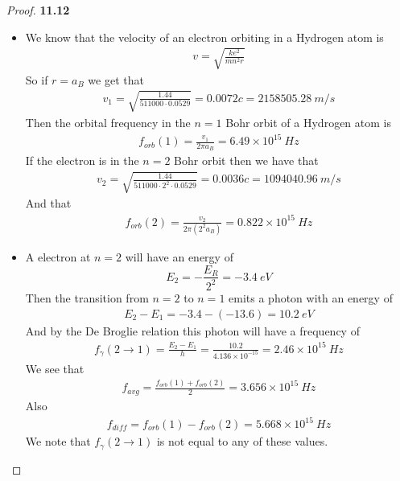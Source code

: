 \documentclass[11pt]{article}
\newcommand{\sci}[1]{\times 10^{#1}}
\theoremstyle{definition}
\begin{document}
\cleardoublepage
\begin{proof}{\textbf{11.12}}
\begin{itemize}
\item [\textbf{(a)}] We know that the velocity of an electron orbiting in a
Hydrogen atom is
\begin{align*}
    v = \sqrt{\frac{ke^2}{mn^2r}}
\end{align*}
So if $r = a_B$ we get that
\begin{align*}
    v_1 = \sqrt{\frac{1.44}{511000 \cdot 0.0529}}
    = 0.0072c = 2158505.28~m/s
\end{align*}
Then the orbital frequency in the $n=1$ Bohr orbit of a Hydrogen atom is
\begin{align*}
    f_{orb}(1) = \frac{v_1}{2\pi a_B} = 6.49\sci{15}~Hz
\end{align*}
If the electron is in the $n=2$ Bohr orbit then we have that
\begin{align*}
    v_2 = \sqrt{\frac{1.44}{511000 \cdot 2^2 \cdot 0.0529}}
    = 0.0036c = 1094040.96~m/s
\end{align*}
And that 
\begin{align*}
    f_{orb}(2) = \frac{v_2}{2\pi (2^2a_B)} = 0.822\sci{15}~Hz
\end{align*}
\item[\textbf{(b)}] A electron at $n= 2$ will have an energy of
$$E_2 = -\frac{E_R}{2^2} = -3.4~eV$$
Then the transition from $n=2$ to $n=1$ emits a photon with an energy of
\begin{align*}
    E_2 - E_1 = -3.4 - (-13.6) = 10.2~eV
\end{align*}
And by the De Broglie relation this photon will have a frequency of
\begin{align*}
    f_\gamma(2\to 1)
    = \frac{E_2 - E_1}{h} = \frac{10.2}{4.136\sci{-15}} = 2.46\sci{15}~Hz
\end{align*}
We see that
\begin{align*}
    f_{avg} = \frac{f_{orb}(1) + f_{orb}(2)}{2} = 3.656\sci{15}~Hz
\end{align*}
Also
\begin{align*}
    f_{diff} = f_{orb}(1) - f_{orb}(2) = 5.668\sci{15}~Hz
\end{align*}
We note that $f_\gamma(2\to 1)$ is not equal to any of these values.


\end{itemize}
\end{proof}
\end{document}
